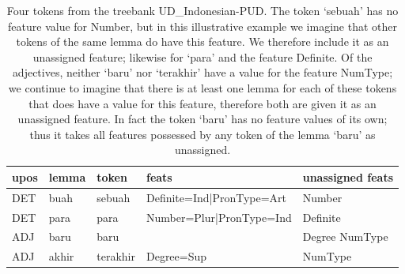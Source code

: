\documentclass[USenglish]{article}
\begin{document}
\begin{table}[h]
    \centering
    \caption{Four tokens from the treebank UD\_Indonesian-PUD. The token `sebuah' has no feature value for Number, but in this illustrative example we imagine that other tokens of the same lemma do have this feature. We therefore include it as an unassigned feature; likewise for `para' and the feature Definite. Of the adjectives, neither `baru' nor `terakhir' have a value for the feature NumType; we continue to imagine that there is at least one lemma for each of these tokens that does have a value for this feature, therefore both are given it as an unassigned feature. In fact the token `baru' has no feature values of its own; thus it takes all features possessed by any token of the lemma `baru' as unassigned.} %
    \label{tab:unassigned_ex}   
    \begin{tabular}{p{1cm}p{1.4cm}p{1.5cm}p{3.5cm}p{2.5cm}}
\toprule

upos&lemma	&token	&feats & unassigned feats	\\ 
\midrule
DET & buah & sebuah 
& Definite=Ind|PronType=Art
& Number
\\\midrule
DET & para	& para	&Number=Plur|PronType=Ind & Definite
\\\midrule
ADJ&baru	&baru&
& Degree \newline
NumType 
\\\midrule
ADJ & akhir	&terakhir&	Degree=Sup& NumType\\\bottomrule
\end{tabular}
\end{table}
\end{document}
